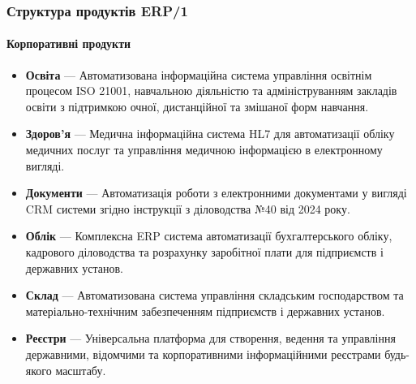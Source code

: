 \documentclass{article}
\begin{document}
\newpage
\subsubsection{Структура продуктів ERP/1}

\paragraph{Корпоративні продукти}
\begin{itemize}
    \item \textbf{Освіта} --- Автоматизована інформаційна система управління освітнім процесом ISO 21001, навчальною діяльністю та адмініструванням закладів освіти з підтримкою очної, дистанційної та змішаної форм навчання.
    \item \textbf{Здоров'я} --- Медична інформаційна система HL7 для автоматизації обліку медичних послуг та управління медичною інформацією в електронному вигляді.
    \item \textbf{Документи} --- Автоматизація роботи з електронними документами у вигляді CRM системи згідно інструкції з діловодства №40 від 2024 року.
    \item \textbf{Облік} --- Комплексна ERP система автоматизації бухгалтерського обліку, кадрового діловодства та розрахунку заробітної плати для підприємств і державних установ.
    \item \textbf{Склад} --- Автоматизована система управління складським господарством та матеріально-технічним забезпеченням підприємств і державних установ.
    \item \textbf{Реєстри} --- Універсальна платформа для створення, ведення та управління державними, відомчими та корпоративними інформаційними реєстрами будь-якого масштабу.
\end{itemize}
\end{document}
